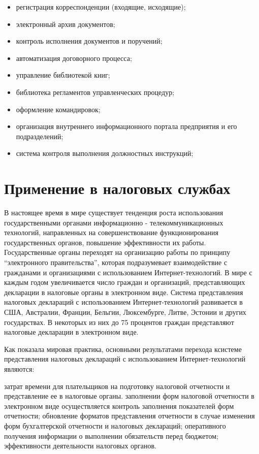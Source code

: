 \documentclass[14pt,a4paper]{reportmod}
\begin{document}
\begin{itemize}
  \item регистрация корреспонденции (входящие, исходящие);
  \item электронный архив документов;
  \item контроль исполнения документов и поручений;
  \item автоматизация договорного процесса;
  \item управление библиотекой книг;
  \item библиотека регламентов управленческих процедур;
  \item оформление командировок;
  \item организация внутреннего информационного портала предприятия и его подразделений;
  \item система контроля выполнения должностных инструкций;
\end{itemize}

\section{Применение в налоговых службах}
В настоящее время в мире существует тенденция роста использования государственными органами информационно - телекоммуникационных технологий, направленных на совершенствование функционирования государственных органов, повышение эффективности их работы. Государственные органы переходят на организацию работы по принципу ``электронного правительства'', которая подразумевает взаимодействие с гражданами и организациями с использованием Интернет-технологий. В мире с каждым годом увеличивается число граждан и организаций, представляющих декларации в налоговые органы в электронном виде. Система представления налоговых деклараций с использованием Интернет-технологий развивается в США, Австралии, Франции, Бельгии, Люксембурге, Литве, Эстонии и других государствах. В некоторых из них до 75 процентов граждан представляют налоговые декларации в электронном виде.

Как показала мировая практика, основными результатами перехода ксистеме представления налоговых деклараций с использованием Интернет-технологий являются:
\begin{itemize}
   затрат времени для плательщиков на подготовку налоговой отчетности и представление ее в налоговые органы. заполнении форм налоговой отчетности в электронном виде осуществляется контроль заполнения показателей форм отчетности;
   обновление форматов представления отчетности в случае изменения форм бухгалтерской отчетности и налоговых деклараций;
   оперативного получения информации о выполнении обязательств перед бюджетом;
   эффективности деятельности налоговых органов.
\end{itemize}
\end{document}
